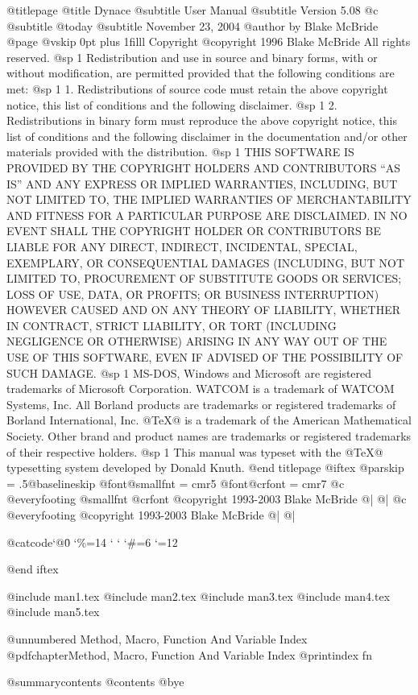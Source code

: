 @titlepage
@title Dynace
@subtitle User Manual
@subtitle Version 5.08
@c @subtitle @today{}
@subtitle November 23, 2004
@author by Blake McBride
@page
@vskip 0pt plus 1filll
Copyright  @copyright{} 1996 Blake McBride
All rights reserved.
@sp 1
Redistribution and use in source and binary forms, with or without
modification, are permitted provided that the following conditions are
met:
@sp 1
1. Redistributions of source code must retain the above copyright
notice, this list of conditions and the following disclaimer.
@sp 1
2. Redistributions in binary form must reproduce the above copyright
notice, this list of conditions and the following disclaimer in the
documentation and/or other materials provided with the distribution.
@sp 1
THIS SOFTWARE IS PROVIDED BY THE COPYRIGHT HOLDERS AND CONTRIBUTORS
``AS IS'' AND ANY EXPRESS OR IMPLIED WARRANTIES, INCLUDING, BUT NOT
LIMITED TO, THE IMPLIED WARRANTIES OF MERCHANTABILITY AND FITNESS FOR
A PARTICULAR PURPOSE ARE DISCLAIMED. IN NO EVENT SHALL THE COPYRIGHT
HOLDER OR CONTRIBUTORS BE LIABLE FOR ANY DIRECT, INDIRECT, INCIDENTAL,
SPECIAL, EXEMPLARY, OR CONSEQUENTIAL DAMAGES (INCLUDING, BUT NOT
LIMITED TO, PROCUREMENT OF SUBSTITUTE GOODS OR SERVICES; LOSS OF USE,
DATA, OR PROFITS; OR BUSINESS INTERRUPTION) HOWEVER CAUSED AND ON ANY
THEORY OF LIABILITY, WHETHER IN CONTRACT, STRICT LIABILITY, OR TORT
(INCLUDING NEGLIGENCE OR OTHERWISE) ARISING IN ANY WAY OUT OF THE USE
OF THIS SOFTWARE, EVEN IF ADVISED OF THE POSSIBILITY OF SUCH DAMAGE.
@sp 1
MS-DOS, Windows and Microsoft are registered trademarks of
Microsoft Corporation.  WATCOM is a trademark of WATCOM Systems,
Inc. All Borland products are trademarks or registered trademarks of
Borland International, Inc. @TeX@ is a trademark of the American
Mathematical Society. Other brand and product names are trademarks or
registered trademarks of their respective holders.
@sp 1
This manual was typeset with the @TeX@ typesetting system developed by
Donald Knuth.
@end titlepage
@iftex
@parskip = .5@baselineskip
@font@smallfnt = cmr5
@font@crfont = cmr7
@c @everyfooting {@smallfnt {@crfont @copyright{}} 1993-2003 Blake McBride} @| @|
@c @everyfooting { @copyright{} 1993-2003 Blake McBride} @| @|


{@catcode`@\=0 \catcode`\%=14 \catcode` \catcode` \catcode `\#=6 \catcode `\@=12

}

@end iftex


@include man1.tex
@include man2.tex
@include man3.tex
@include man4.tex
@include man5.tex


@unnumbered Method, Macro, Function And Variable Index
@pdfchapter{Method, Macro, Function And Variable Index}
@printindex fn

@summarycontents
@contents
@bye

